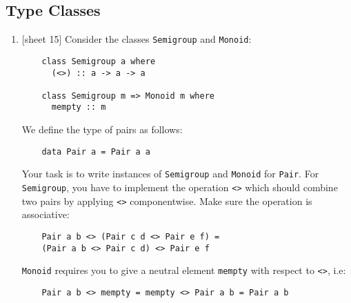 \documentclass{article}
\def\code#1{\texttt{#1}}
\begin{document}
\subsection{Type Classes}
\begin{enumerate}
    \item {[sheet 15]} Consider the classes \code{Semigroup} and \code{Monoid}:
        \begin{verbatim}
    class Semigroup a where
      (<>) :: a -> a -> a

    class Semigroup m => Monoid m where
      mempty :: m
        \end{verbatim}
        We define the type of pairs as follows:
        \begin{verbatim}
    data Pair a = Pair a a
        \end{verbatim}
        Your task is to write instances of \code{Semigroup} and \code{Monoid} for \code{Pair}. For \code{Semigroup}, you have to implement the operation \code{<>} which should combine two pairs by applying \code{<>} componentwise. Make sure the operation is associative:
        \begin{verbatim}
    Pair a b <> (Pair c d <> Pair e f) =
    (Pair a b <> Pair c d) <> Pair e f
        \end{verbatim}
        \code{Monoid} requires you to give a neutral element \code{mempty} with respect to \code{<>}, i.e:
        \begin{verbatim}
    Pair a b <> mempty = mempty <> Pair a b = Pair a b
        \end{verbatim}
\end{enumerate}
\end{document}
